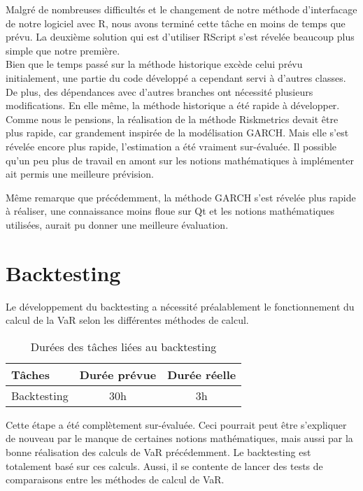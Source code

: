 \documentclass[a4paper]{report}
\begin{document}
Malgré de nombreuses difficultés et le changement de notre méthode d'interfacage de notre logiciel avec R, nous avons terminé cette tâche en moins de temps que prévu.
La deuxième solution qui est d'utiliser RScript s'est révelée beaucoup plus simple que notre première.\\

Bien que le temps passé sur la méthode historique excède celui prévu initialement, une partie du code développé a cependant servi à d'autres classes.
De plus, des dépendances avec d'autres branches ont nécessité plusieurs modifications.
En elle même, la méthode historique a été rapide à développer.\\

Comme nous le pensions, la réalisation de la méthode Riskmetrics devait être plus rapide, car grandement inspirée de la modélisation GARCH.
Mais elle s'est révelée encore plus rapide, l'estimation a été vraiment sur-évaluée.
Il possible qu'un peu plus de travail en amont sur les notions mathématiques à implémenter ait permis une meilleure prévision.

Même remarque que précédemment, la méthode GARCH s'est révelée plus rapide à réaliser, une connaissance moins floue sur Qt et les notions mathématiques utilisées, aurait pu donner une meilleure évaluation.

\section{Backtesting}
Le développement du backtesting a nécessité préalablement le fonctionnement du calcul de la VaR selon les différentes méthodes de calcul.

\begin{table}[H]
\centering
  \begin{tabularx}{0.8\textwidth}{| X | c | c |}
    \hline
	Tâches & Durée prévue & Durée réelle \\
    \hline
    Backtesting &  30h & 3h\\
    \hline
  \end{tabularx}
  \caption{Durées des tâches liées au backtesting}
\end{table}

Cette étape a été complètement sur-évaluée.
Ceci pourrait peut être s'expliquer de nouveau par le manque de certaines notions mathématiques, mais aussi par la bonne réalisation des calculs de VaR précédemment.
Le backtesting est totalement basé sur ces calculs. Aussi, il se contente de lancer des tests de comparaisons entre les méthodes de calcul de VaR.
\end{document}
